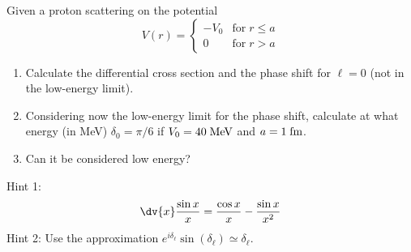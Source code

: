 \begin{esercizio}
   Given a proton scattering on the potential
   \begin{equation*}
      V(r)=
      \begin{cases}
         -V_0 & \text{for} \; r \leq a\\
         0 & \text{for} \; r > a
      \end{cases}
   \end{equation*}
   \begin{enumerate}[label=\alph*), leftmargin=0.6cm]
      \item Calculate the differential cross section and the phase shift for $\ell=0$ (not in the low-energy limit).
      \item Considering now the low-energy limit for the phase shift, calculate at what energy (in MeV) $\delta_0=\pi/6$ if $V_0=40 \rm \; MeV$ and $a=1 \rm \; fm$.
      \item Can it be considered low energy?
   \end{enumerate}
   Hint 1:
   \begin{equation*}
      \dv{x} \frac{\sin{x}}{x}
      =\frac{\cos{x}}{x} - \frac{\sin{x}}{x^2}
   \end{equation*}
   Hint 2: Use the approximation $e^{i \delta_{\ell}} \sin{(\delta_{\ell})} \simeq \delta_{\ell}$.
\end{esercizio}
